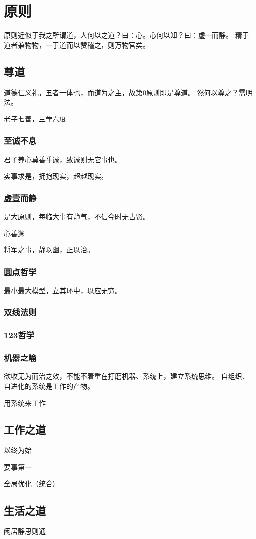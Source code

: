 \chapter{原则}

原则近似于我之所谓道，人何以之道？曰：心。心何以知？曰：虚一而静。
精于道者兼物物，一于道而以赞稽之，则万物官矣。

\section{尊道}

道德仁义礼，五者一体也，而道为之主，故第0原则即是尊道。
然何以尊之？需明法。

老子七善，三学六度

\subsection{至诚不息}

君子养心莫善乎诚，致诚则无它事也。

实事求是，拥抱现实，超越现实。

\subsection{虚壹而静}

是大原则，每临大事有静气，不信今时无古贤。

心善渊

将军之事，静以幽，正以治。

\subsection{圆点哲学}

最小最大模型，立其环中，以应无穷。

\subsection{双线法则}

\subsection{123哲学}

\subsection{机器之喻}

欲收无为而治之效，不能不着重在打磨机器、系统上，建立系统思维。
自组织、自进化的系统是工作的产物。

用系统来工作

\section{工作之道}

以终为始

要事第一

全局优化（统合）

\section{生活之道}

闲居静思则通
